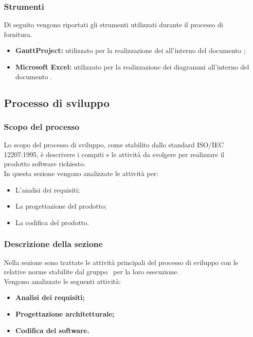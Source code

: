 \subsubsection{Strumenti}\label{PF_Strumenti}
Di seguito vengono riportati gli strumenti utilizzati durante il processo di fornitura.
\begin{itemize}
	\item \textbf{GanttProject:} utilizzato per la realizzazione dei  all'interno del documento ;
	\item \textbf{Microsoft Excel:} utilizzato per la realizzazione dei diagrammi all'interno del documento .
\end{itemize}
\newpage

\subsection{Processo di sviluppo}
\subsubsection{Scopo del processo}\label{PS_Scopo}
Lo scopo del processo di sviluppo, come stabilito dallo standard ISO/IEC 12207:1995, è descrivere i compiti e le attività da svolgere per realizzare il prodotto software richiesto.\\
In questa sezione vengono analizzate le attività per:
\begin{itemize}
	\item L'analisi dei requisiti;
	\item La progettazione del prodotto;
	\item La codifica del prodotto.
\end{itemize}

\subsubsection{Descrizione della sezione} 
Nella sezione sono trattate le attività principali del processo di sviluppo con le relative norme stabilite dal gruppo \Gruppo\ per la loro esecuzione.\\
Vengono analizzate le seguenti attività:
\begin{itemize}
\item \textbf{Analisi dei requisiti;}
\item \textbf{Progettazione architetturale;}
\item \textbf{Codifica del software.}
\end{itemize}

